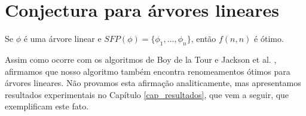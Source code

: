 \section{Conjectura para árvores lineares}

\indent

\begin{conjecture}
	\label{conjectura}
	Se $\phi$ é uma árvore linear e $SFP(\phi) = \{\phi_1,...,\phi_n \}$, então $f(n,n)$ é ótimo.
\end{conjecture}

Assim como ocorre com os algoritmos de Boy de la Tour \cite{de1992optimality} e Jackson et al. \cite{jackson2004clause}, afirmamos que nosso algoritmo também encontra renomeamentos ótimos para árvores lineares. Não provamos esta afirmação analiticamente, mas apresentamos resultados experimentais no Capítulo \ref{cap_resultados}, que vem a seguir, que exemplificam este fato.
